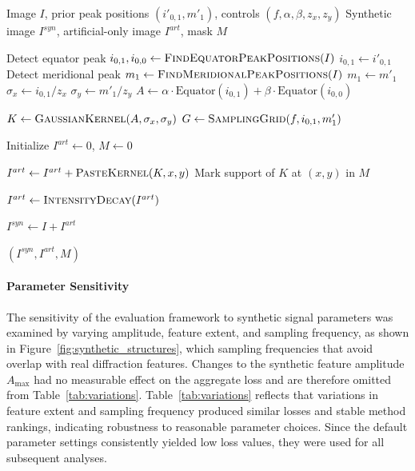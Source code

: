 \documentclass[iucr]{iucrjournals}
\begin{document}
\begin{algorithm}[htbp]
\centering
\begin{minipage}{0.96\columnwidth}
\begin{algorithmic}[1]

\Require Image $I$, prior peak positions $(i'_{0,1}, m'_1)$, controls $(f, \alpha, \beta, z_x, z_y)$
\Ensure Synthetic image $I^{syn}$, artificial-only image $I^{art}$, mask $M$

\State Detect equator peak $i_{0,1}, i_{0,0} \leftarrow \textsc{FindEquatorPeakPositions}(I)$
    \State $i_{0,1} \leftarrow i'_{0,1}$
\EndIf
\State Detect meridional peak $m_1 \leftarrow \textsc{FindMeridionalPeakPositions}(I)$
    \State $m_1 \leftarrow m'_1$
\EndIf
\State $\sigma_x \leftarrow i_{0,1} / z_x$
\State $\sigma_y \leftarrow m'_1 / z_y$
\State $A \leftarrow \alpha \cdot \text{Equator}(i_{0,1}) + \beta \cdot \text{Equator}(i_{0,0})$

\State $K \leftarrow \textsc{GaussianKernel}(A, \sigma_x, \sigma_y)$
\State $G \leftarrow \textsc{SamplingGrid}(f, i_{0,1}, m'_1)$

\State Initialize $I^{art} \leftarrow 0$, $M \leftarrow 0$

    \State $I^{art} \leftarrow I^{art} + \textsc{PasteKernel}(K, x, y)$
    \State Mark support of $K$ at $(x,y)$ in $M$
\EndFor

\State $I^{art} \gets \textsc{IntensityDecay}(I^{art})$

\State $I^{syn} \leftarrow I + I^{art}$

\State \Return $(I^{syn}, I^{art}, M)$

\end{algorithmic}
\end{minipage}
\caption{Procedure for synthetic-feature generation and mask construction used for validation in the absence of ground-truth background.}
\label{alg:synthetic_signal}
\end{algorithm}


\paragraph{Parameter Sensitivity}
The sensitivity of the evaluation framework to synthetic signal parameters was examined by varying amplitude, feature extent, and sampling frequency, as shown in Figure~\ref{fig:synthetic_structures}, which sampling frequencies that avoid overlap with real diffraction features. Changes to the synthetic feature amplitude $A_{\mathrm{max}}$ had no measurable effect on the aggregate loss and are therefore omitted from Table~\ref{tab:variations}. Table~\ref{tab:variations} reflects that variations in feature extent and sampling frequency produced similar losses and stable method rankings, indicating robustness to reasonable parameter choices. Since the default parameter settings consistently yielded low loss values, they were used for all subsequent analyses.
\end{document}
